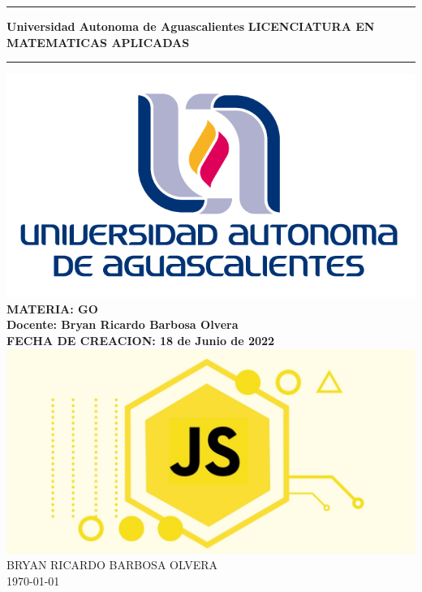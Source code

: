 \documentclass[10pt,a4paper]{article}
\begin{document}
\begin{titlepage}
\begin{center}
\vspace*{2\baselineskip}%
\hrule height 3pt
\vspace*{0.5\baselineskip}%
{\Huge \textbf{Universidad Autonoma de Aguascalientes}}
{\Large \textbf{LICENCIATURA EN MATEMATICAS APLICADAS}}
\vspace*{0.5\baselineskip}%
\hrule
\vspace*{0.5\baselineskip}%
\includegraphics[scale=0.5]{figuras/logo}
\vspace*{2\baselineskip} \\%
\textbf{\large MATERIA: GO} \\
\vspace*{1.5\baselineskip}
\textbf{\large Docente: Bryan Ricardo Barbosa Olvera} \\
\vspace*{1.5\baselineskip}
\textbf{\large FECHA DE CREACION: 18 de Junio de 2022} \\  
\vspace*{3\baselineskip}
\includegraphics[scale=0.5]{figuras/imagen}
\vfill
BRYAN RICARDO BARBOSA OLVERA \\
\today \\

\end{center}
\end{titlepage}
\end{document}
